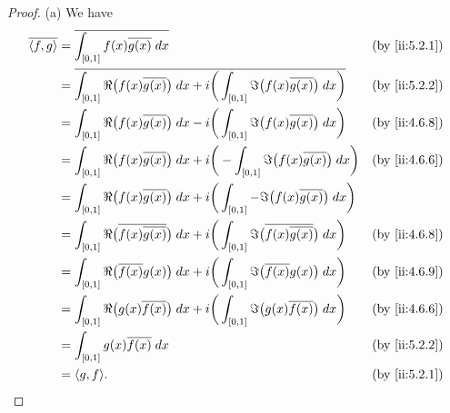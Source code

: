 \begin{proof}{(a)}
  We have
  \begin{align*}
    \overline{\inner*{f, g}} & = \overline{\int_{[0, 1]} f(x) \overline{g(x)} \; dx}                                                                                               &  & \by{ii:5.2.1} \\
                             & = \overline{\int_{[0, 1]} \Re\big(f(x) \overline{g(x)}\big) \; dx + i \bigg(\int_{[0, 1]} \Im\big(f(x) \overline{g(x)}\big) \; dx\bigg)}            &  & \by{ii:5.2.2} \\
                             & = \int_{[0, 1]} \Re\big(f(x) \overline{g(x)}\big) \; dx - i \bigg(\int_{[0, 1]} \Im\big(f(x) \overline{g(x)}\big) \; dx\bigg)                       &  & \by{ii:4.6.8} \\
                             & = \int_{[0, 1]} \Re\big(f(x) \overline{g(x)}\big) \; dx + i \bigg(-\int_{[0, 1]} \Im\big(f(x) \overline{g(x)}\big) \; dx\bigg)                      &  & \by{ii:4.6.6} \\
                             & = \int_{[0, 1]} \Re\big(f(x) \overline{g(x)}\big) \; dx + i \bigg(\int_{[0, 1]} -\Im\big(f(x) \overline{g(x)}\big) \; dx\bigg)                                         \\
                             & = \int_{[0, 1]} \Re\big(\overline{f(x) \overline{g(x)}}\big) \; dx + i \bigg(\int_{[0, 1]} \Im\big(\overline{f(x) \overline{g(x)}}\big) \; dx\bigg) &  & \by{ii:4.6.8} \\
                             & = \int_{[0, 1]} \Re\big(\overline{f(x)} g(x)\big) \; dx + i \bigg(\int_{[0, 1]} \Im\big(\overline{f(x)} g(x)\big) \; dx\bigg)                       &  & \by{ii:4.6.9} \\
                             & = \int_{[0, 1]} \Re\big(g(x) \overline{f(x)}\big) \; dx + i \bigg(\int_{[0, 1]} \Im\big(g(x) \overline{f(x)}\big) \; dx\bigg)                       &  & \by{ii:4.6.6} \\
                             & = \int_{[0, 1]} g(x) \overline{f(x)} \; dx                                                                                                          &  & \by{ii:5.2.2} \\
                             & = \inner*{g, f}.                                                                                                                                    &  & \by{ii:5.2.1}
  \end{align*}
\end{proof}

